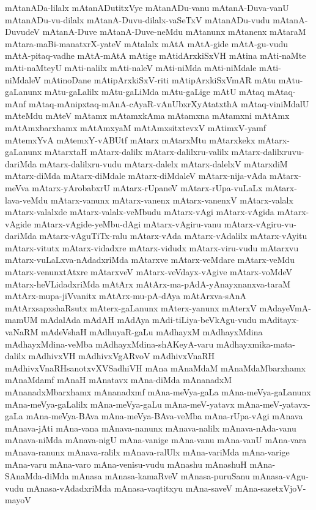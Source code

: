{mAtanADa-lilalx
mAtanADutitxVye
mAtanADu-vanu
mAtanA-Duva-vanU
mAtanADu-vu-dilalx
mAtanA-Duvu-dilalx-vaSeTxV
mAtanADu-vudu
mAtanA-DuvudeV
mAtanA-Duve
mAtanA-Duve-neMdu
mAtanunx
mAtanenx
mAtaraM
mAtara-maBi-manatxrX-yateV
mAtalalx
mAtA
mAtA-gide
mAtA-gu-vudu
mAtA-pitaq-vadhe
mAtA-mAtA
mAtige
mAtidArxkiSxVH
mAtina
mAti-naMte
mAti-naMteyU
mAti-nalilx
mAti-naleV
mAti-niMda
mAti-niMdale
mAti-niMdaleV
mAtinoDane
mAtipArxkiSxV-riti
mAtipArxkiSxVmAR
mAtu
mAtu-gaLanunx
mAtu-gaLalilx
mAtu-gaLiMda
mAtu-gaLige
mAtU
mAtaq
mAtaq-mAnf
mAtaq-mAnipxtaq-mAnA-cAyaR-vAnUbxrXyAtatxthA
mAtaq-viniMdalU
mAteMdu
mAteV
mAtamx
mAtamxkAma
mAtamxna
mAtamxni
mAtAmx
mAtAmxbarxhamx
mAtAmxyaM
mAtAmxsitxtevxV
mAtimxV-yamf
mAtemxYvA
mAtemxY-vABUtf
mAtarx
mAtarxMtu
mAtarxkekx
mAtarx-gaLanunx
mAtarxtaH
mAtarx-dalilx
mAtarx-dalilxru-valilx
mAtarx-dalilxruvu-dariMda
mAtarx-dalilxru-vudu
mAtarx-dalelx
mAtarx-dalelxV
mAtarxdiM
mAtarx-diMda
mAtarx-diMdale
mAtarx-diMdaleV
mAtarx-nija-vAda
mAtarx-meVva
mAtarx-yArobabxrU
mAtarx-rUpaneV
mAtarx-rUpa-vuLaLx
mAtarx-lava-veMdu
mAtarx-vanunx
mAtarx-vanenx
mAtarx-vanenxV
mAtarx-valalx
mAtarx-valalxde
mAtarx-valalx-veMbudu
mAtarx-vAgi
mAtarx-vAgida
mAtarx-vAgide
mAtarx-vAgide-yeMbu-dAgi
mAtarx-vAgiru-vanu
mAtarx-vAgiru-vu-dariMda
mAtarx-vAguTiTx-ralu
mAtarx-vAda
mAtarx-vAdalilx
mAtarx-vAyitu
mAtarx-vitutx
mAtarx-vidadxre
mAtarx-vidudx
mAtarx-viru-vudu
mAtarxvu
mAtarx-vuLaLxva-nAdadxriMda
mAtarxve
mAtarx-veMdare
mAtarx-veMdu
mAtarx-venunxtAtxre
mAtarxveV
mAtarx-veVdayx-vAgive
mAtarx-voMdeV
mAtarx-heVLidadxriMda
mAtArx
mAtArx-ma-pAdA-yAnayxnanxva-taraM
mAtArx-mupa-jiVvanitx
mAtArx-mu-pA-dAya
mAtArxva-sAnA
mAtArxsapxshaRsutx
mAterx-gaLanunx
mAterx-yanunx
mAterxV
mAdayeVmA-mamUM
mAdalAda
mAdAH
mAdAya
mAdi-tiLiya-beVkAgu-vudu
mAditayx-vaNaRM
mAdeVshaH
mAdhuyaR-gaLu
mAdhayxM
mAdhayxMdina
mAdhayxMdina-veMba
mAdhayxMdina-shAKeyA-varu
mAdhayxmika-mata-dalilx
mAdhivxVH
mAdhivxVgARvoV
mAdhivxVnaRH
mAdhivxVnaRHsanotxvXVSadhiVH
mAna
mAnaMdaM
mAnaMdaMbarxhamx
mAnaMdamf
mAnaH
mAnatavx
mAna-diMda
mAnanadxM
mAnanadxMbarxhamx
mAnanadxmf
mAna-meVya-gaLa
mAna-meVya-gaLanunx
mAna-meVya-gaLalilx
mAna-meVya-gaLu
mAna-meV-yatavx
mAna-meV-yatavx-gaLa
mAna-meVya-BAva
mAna-meVya-BAva-veMba
mAna-rUpa-vAgi
mAnava
mAnava-jAti
mAna-vana
mAnava-nanunx
mAnava-nalilx
mAnava-nAda-vanu
mAnava-niMda
mAnava-nigU
mAna-vanige
mAna-vanu
mAna-vanU
mAna-vara
mAnava-ranunx
mAnava-ralilx
mAnava-ralUlx
mAna-variMda
mAna-varige
mAna-varu
mAna-varo
mAna-venisu-vudu
mAnashu
mAnashuH
mAna-SAnaMda-diMda
mAnasa
mAnasa-kamaRveV
mAnasa-puruSanu
mAnasa-vAgu-vudu
mAnasa-vAdadxriMda
mAnasa-vaqtitxyu
mAna-saveV
mAna-sasetxVjoV-mayoV
}
